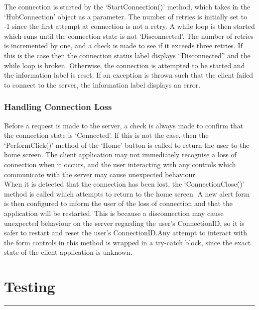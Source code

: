 \documentclass{article}
\begin{document}
The connection is started by the `StartConnection()' method, which takes in the `HubConnection' object as a parameter. The number of retries is initially set to -1 since the first attempt at connection is not a retry. A while loop is then started which runs until the connection state is not `Disconnected'. The number of retries is incremented by one, and a check is made to see if it exceeds three retries. If this is the case then the connection status label displays ``Disconnected'' and the while loop is broken. Otherwise, the connection is attempted to be started and the information label is reset. If an exception is thrown such that the client failed to connect to the server, the information label displays an error.

\subsubsection{Handling Connection Loss}

Before a request is made to the server, a check is always made to confirm that the connection state is `Connected'. If this is not the case, then the `PerformClick()' method of the `Home' button is called to return the user to the home screen. The client application may not immediately recognise a loss of connection when it occurs, and the user interacting with any controls which communicate with the server may cause unexpected behaviour. \\

When it is detected that the connection has been lost, the `ConnectionClose()' method is called which attempts to return to the home screen. A new alert form is then configured to inform the user of the loss of connection and that the application will be restarted. This is because a disconnection may cause unexpected behaviour on the server regarding the user's ConnectionID, so it is safer to restart and reset the user's ConnectionID.\@ Any attempt to interact with the form controls in this method is wrapped in a try-catch block, since the exact state of the client application is unknown. \\ 

\newpage
\section{Testing}
\noindent\rule{\textwidth}{0.2pt}
\renewcommand{\arraystretch}{1.5} %

\end{document}
